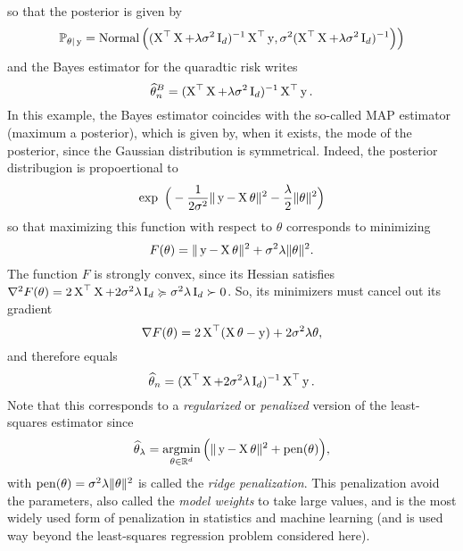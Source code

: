 so that the posterior is given by
\begin{equation*}
	\mathbb P_{\theta | \operatorname{{\boldsymbol y}}} = \operatorname{Normal} \Big( (\operatorname{{\boldsymbol X}}^\top \operatorname{{\boldsymbol X}}  + \lambda \sigma^2 \operatorname{{\boldsymbol I}}_d)^{-1} \operatorname{{\boldsymbol X}}^\top \operatorname{{\boldsymbol y}},
	\sigma^2 (\operatorname{{\boldsymbol X}}^\top \operatorname{{\boldsymbol X}} + \lambda \sigma^2 \operatorname{{\boldsymbol I}}_d)^{-1} \Big)
	 \Big)
\end{equation*}
and the Bayes estimator for the quaradtic risk writes
\begin{equation*}
	\widehat \theta_n^B = (\operatorname{{\boldsymbol X}}^\top \operatorname{{\boldsymbol X}}  + \lambda \sigma^2 \operatorname{{\boldsymbol I}}_d)^{-1} \operatorname{{\boldsymbol X}}^\top \operatorname{{\boldsymbol y}}.
\end{equation*}
In this example, the Bayes estimator coincides with the so-called MAP estimator (maximum a posterior), which is given by, when it exists, the mode of the posterior, since the Gaussian distribution is symmetrical.
Indeed, the posterior distribugion is propoertional to
\begin{equation*}
	\exp \Big( -\frac{1}{2 \sigma^2} \norm{\by - \bX \theta}^2 - \frac{\lambda}{2} \norm{\theta}^2 \Big)
\end{equation*}
so that maximizing this function with respect to $\theta$ corresponds to minimizing
\begin{equation*}
	F(\theta) = \| \operatorname{{\boldsymbol y}} - \operatorname{{\boldsymbol X}} \theta \|^2 + \sigma^2 \lambda \| \theta \|^2.
\end{equation*}
The function $F$ is strongly convex, since its Hessian satisfies $\nabla^2 F(\theta) = 2 \operatorname{{\boldsymbol X}}^\top \operatorname{{\boldsymbol X}} + 2\sigma^2 \lambda \operatorname{{\boldsymbol I}}_d \succcurlyeq \sigma^2 \lambda \operatorname{{\boldsymbol I}}_d \succ 0$.
So, its minimizers must cancel out its gradient
\begin{equation*}
	\nabla F(\theta) = 2 \operatorname{{\boldsymbol X}}^\top (\operatorname{{\boldsymbol X}} \theta - \operatorname{{\boldsymbol y}}) + 2 \sigma^2 \lambda \theta,
\end{equation*}
and therefore equals
\begin{equation*}
	\widehat \theta_n = (\operatorname{{\boldsymbol X}}^\top \operatorname{{\boldsymbol X}} + 2 \sigma^2 \lambda \operatorname{{\boldsymbol I}}_d)^{-1} \operatorname{{\boldsymbol X}}^\top \operatorname{{\boldsymbol y}}.
\end{equation*}
Note that this corresponds to a \emph{regularized} or \emph{penalized} version of the least-squares estimator 
since
\begin{equation*}
	\widehat \theta_\lambda = \operatorname*{argmin}_{\theta \in \mathbb R^d} \Big( \| \operatorname{{\boldsymbol y}} - \operatorname{{\boldsymbol X}} \theta \|^2 + \operatorname{pen}(\theta) \Big),
\end{equation*}
with $\operatorname{pen}(\theta) = \sigma^2 \lambda \| \theta \|^2$ is called the \emph{ridge penalization}.
This penalization avoid the parameters, also called the \emph{model weights} to take large values, and is the most widely used form of penalization in statistics and machine learning (and is used way beyond the least-squares regression problem considered here).

